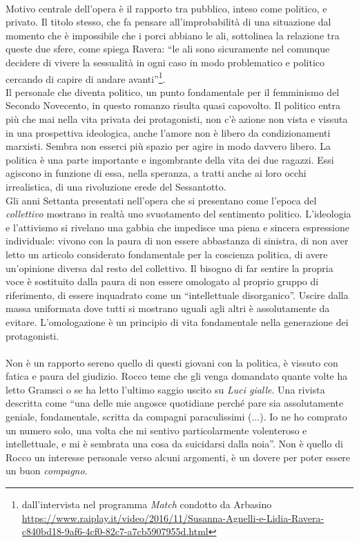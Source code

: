 \paragraph{}Motivo centrale dell'opera è il rapporto tra pubblico, inteso come politico, e privato.
Il titolo stesso, che fa pensare all'improbabilità di una situazione dal momento che è impossibile che i porci abbiano le ali, sottolinea la relazione tra queste due sfere, come spiega Ravera: \enquote{le ali sono sicuramente nel comunque decidere di vivere la sessualità in ogni caso in modo problematico e politico cercando di capire di andare avanti}\footnote{dall'intervista nel programma \textit{Match} condotto da Arbasino \url{ https://www.raiplay.it/video/2016/11/Susanna-Agnelli-e-Lidia-Ravera-c840bd18-9af6-4cf0-82c7-a7cb5907955d.html}}.
\\Il personale che diventa politico, un punto fondamentale per il femminismo del Secondo Novecento, in questo romanzo risulta quasi capovolto.
Il politico entra più che mai nella vita privata dei protagonisti, non c'è azione non vista e vissuta in una prospettiva ideologica, anche l'amore non è libero da condizionamenti marxisti.
Sembra non esserci più spazio per agire in modo davvero libero.
La politica è una parte importante e ingombrante della vita dei due ragazzi.
Essi agiscono in funzione di essa, nella speranza, a tratti anche ai loro occhi irrealistica, di una rivoluzione erede del Sessantotto.
\\Gli anni Settanta presentati nell'opera che si presentano come l'epoca del \textit{collettivo} mostrano in realtà uno svuotamento del sentimento politico.
L'ideologia e l'attivismo si rivelano una gabbia che impedisce una piena e sincera espressione individuale: vivono con la paura di non essere abbastanza di sinistra, di non aver letto un articolo considerato fondamentale per la coscienza politica, di avere un'opinione diversa dal resto del collettivo.
Il bisogno di far sentire la propria voce è sostituito dalla paura di non essere omologato al proprio gruppo di riferimento, di essere inquadrato come un \enquote{intellettuale disorganico}.
Uscire dalla massa uniformata dove tutti si mostrano uguali agli altri è assolutamente da evitare.
L'omologazione è un principio di vita fondamentale nella generazione dei protagonisti.

\paragraph{}Non è un rapporto sereno quello di questi giovani con la politica, è vissuto con fatica e paura del giudizio.
Rocco teme  che gli venga domandato quante volte ha letto Gramsci o se ha letto l'ultimo saggio uscito su \textit{Luci gialle}.
Una rivista descritta come \enquote{una delle mie angosce quotidiane perché pare sia assolutamente geniale, fondamentale, scritta da compagni paraculissimi (...). Io ne ho comprato un numero solo, una volta che mi sentivo particolarmente volenteroso e intellettuale, e mi è sembrata una cosa da suicidarsi dalla noia}.
Non è quello di Rocco un interesse personale verso alcuni argomenti, è un dovere per poter essere un buon \textit{compagno}.

